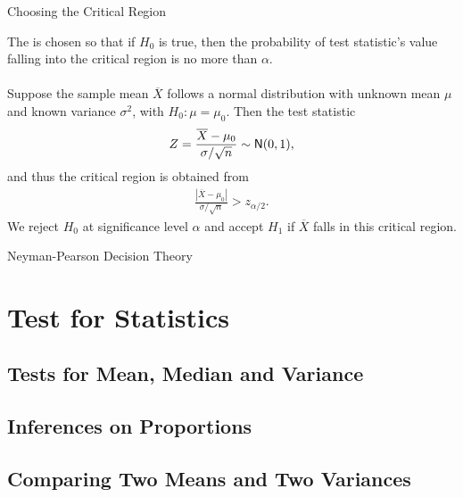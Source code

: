 \begin{frame}{Choosing the Critical Region}

\justifying
{} The  is chosen so that if $H_0$ is true, then the probability of test statistic's value falling into the critical region is no more than $\alpha$. \\
~\\
 Suppose the sample mean $\overline{X}$ follows a normal distribution with unknown mean $\mu$ and known variance $\sigma^2$, with $H_0: \mu = \mu_0$. Then the test statistic
\begin{align*}
Z = \frac{\overline{X} - \mu_0}{\sigma/\sqrt{n}} \sim \mathsf{N}(0, 1),
\end{align*}
and thus the critical region is obtained from
\begin{align*}
\frac{|\overline{X} - \mu_0|}{\sigma/\sqrt{n}} > z_{\alpha/2}.
\end{align*}
We reject $H_0$ at significance level $\alpha$ and accept $H_1$ if $\overline{X}$ falls in this critical region.

\end{frame}

\begin{frame}{Neyman-Pearson Decision Theory}


\end{frame}


\section{Test for Statistics}

\subsection{Tests for Mean, Median and Variance}

\subsection{Inferences on Proportions}


\subsection{Comparing Two Means and Two Variances}